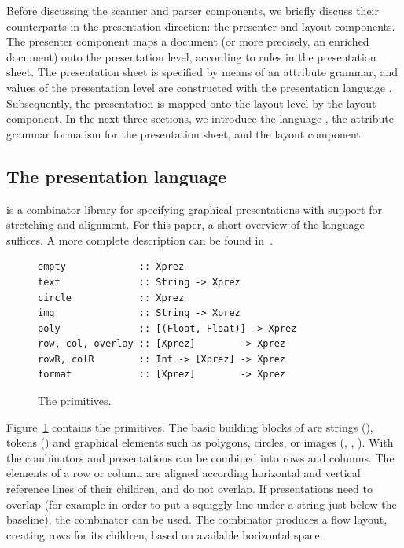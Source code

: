 \documentclass[12pt]{article}
\begin{document}
Before discussing the scanner and parser components, we briefly discuss their counterparts in the presentation direction: the presenter and layout components. The presenter component maps a document (or more precisely, an enriched document) onto the presentation level, according to rules in the presentation sheet. The presentation sheet is specified by means of an attribute grammar, and values of the presentation level are constructed with the presentation language \Xprez. Subsequently, the presentation is mapped onto the layout level by the layout component. In the next three sections, we introduce the language \Xprez, the attribute grammar formalism for the presentation sheet, and the layout component.

\subsection{The {\Xprez} presentation language} \label{sect:xprez}

\Xprez is a combinator library for specifying graphical presentations with support for stretching and alignment. For this paper, a short overview of the language suffices. A more complete description can be found in~\cite{schrage04Proxima}.

\begin{figure}
\begin{footnotesize}
\begin{center}
\begin{footnotesize}
\begin{verbatim}
empty             :: Xprez
text              :: String -> Xprez             
circle            :: Xprez                       
img               :: String -> Xprez             
poly              :: [(Float, Float)] -> Xprez 
row, col, overlay :: [Xprez]        -> Xprez          
rowR, colR        :: Int -> [Xprez] -> Xprez   
format            :: [Xprez]        -> Xprez
\end{verbatim}
\end{footnotesize}
\caption{The {\Xprez} primitives.} \label{fig:xprezPrim} 
\end{center}
\end{footnotesize}
\end{figure}

Figure~\ref{fig:xprezPrim} contains the \Xprez primitives. The basic building blocks of \Xprez are strings (), tokens () and graphical elements such as polygons, circles, or images (, , ). With the combinators  and  presentations can be combined into rows and columns. The elements of a row or column are aligned according horizontal and vertical reference lines of their children, and do not overlap. If presentations need to overlap (for example in order to put a squiggly line under a string just below the baseline), the  combinator can be used. The  combinator produces a flow layout, creating rows for its children, based on available horizontal space.
\end{document}
